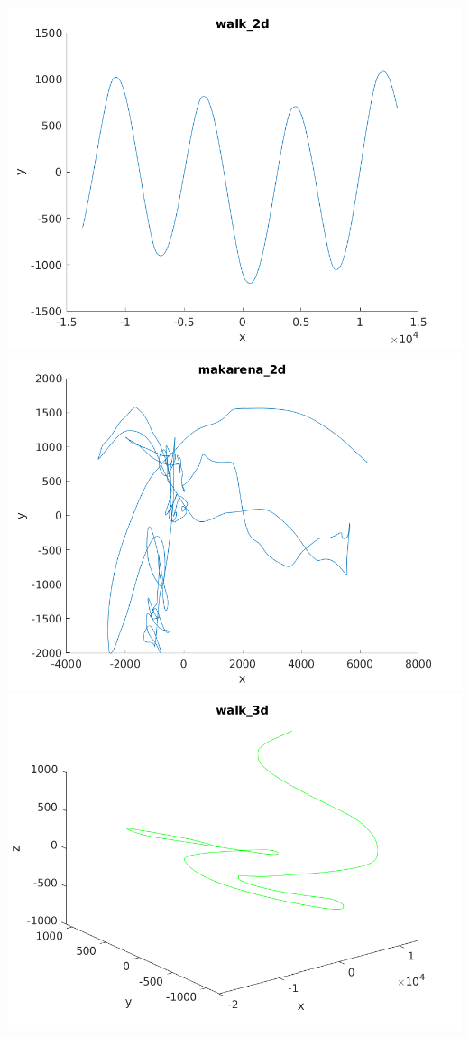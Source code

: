 \documentclass[10pt,a4paper,openright]{article}
\begin{document}
\subsection{}
\includegraphics[scale=0.5]{walk_2d.png}
\includegraphics[scale=0.5]{makarena_2d.png}\\
\includegraphics[scale=0.5]{walk_3d.png}
\end{document}
